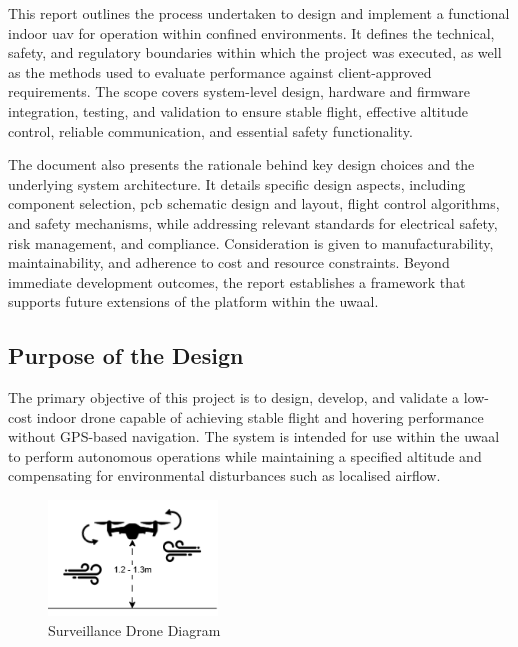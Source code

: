 This report outlines the process undertaken to design and implement a functional indoor \gls{uav} for operation within confined environments. It defines the technical, safety, and regulatory boundaries within which the project was executed, as well as the methods used to evaluate performance against client-approved requirements. The scope covers system-level design, hardware and firmware integration, testing, and validation to ensure stable flight, effective altitude control, reliable communication, and essential safety functionality. 

The document also presents the rationale behind key design choices and the underlying system architecture. It details specific design aspects, including component selection, \gls{pcb} schematic design and layout, flight control algorithms, and safety mechanisms, while addressing relevant standards for electrical safety, risk management, and compliance. Consideration is given to manufacturability, maintainability, and adherence to cost and resource constraints. Beyond immediate development outcomes, the report establishes a framework that supports future extensions of the platform within the \gls{uwaal}. 

\subsection{Purpose of the Design}

The primary objective of this project is to design, develop, and validate a low-cost indoor drone capable of achieving stable flight and hovering performance without GPS-based navigation. The system is intended for use within the \gls{uwaal} to perform autonomous operations while maintaining a specified altitude and compensating for environmental disturbances such as localised airflow. 

\begin{figure}[H]
    \centering
    \captionsetup{justification=centering, margin=1cm}
    \includegraphics[width=0.4\textwidth]{img/intro-drone-gray5.PNG}
    \caption{Surveillance Drone Diagram}
\end{figure}

